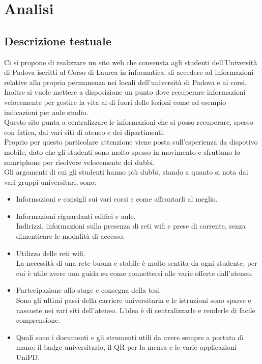 \section{Analisi}
\subsection{Descrizione testuale}

Ci si propone di realizzare un sito web che consensta agli studenti dell'Università di Padova iscritti al Corso di Laurea in informatica. di accedere ad informazioni relative alla propria permanenza nei locali dell'università di Padova e ai corsi.\\
Inoltre si vuole mettere a disposizione un punto dove recuperare informazioni velocemente per gestire la vita al di fuori delle lezioni come ad esempio indicazioni per aule studio.\\
Questo sito punta a centralizzare le informazioni che si posso recuperare, spesso con fatica, dai vari siti di ateneo e dei dipartimenti.\\
Proprio per questo particolare attenzione viene posta sull'esperienza da dispotivo mobile, dato che gli studenti sono molto spesso in movimento e sfruttano lo smartphone per risolvere velocemente dei dubbi.\\
Gli argomenti di cui gli studenti hanno più dubbi, stando a quanto si nota dai vari gruppi universitari, sono:
\begin{itemize}
    \item Informazioni e consigli sui vari corsi e come affrontarli al meglio.
    \item Informazioni riguardanti edifici e aule.\\ Indirizzi, informazioni sulla presenza di reti wifi e prese di corrente, senza dimenticare le modalità di accesso.
    \item Utilizzo delle reti wifi. \\ La necessità di una rete buona e stabile è molto sentita da ogni studente, per cui è utile avere una guida su come connettersi alle varie offerte dall'ateneo.   
    \item Partecipazione allo stage e consegna della tesi. \\ Sono gli ultimi passi della carriere universitaria e le istruzioni sono sparse e nascoste nei vari siti dell'ateneo. L'idea è di centralizzarle e renderle di facile comprensione.
    \item Quali sono i documenti e gli strumenti utili da avere sempre a portata di mano: il badge universitario, il QR per la mensa e le varie applicazioni UniPD.
\end{itemize}

